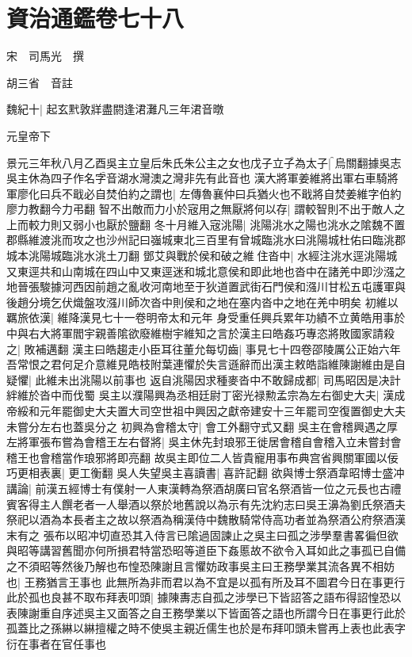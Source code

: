 \chapter{資治通鑑卷七十八}
宋　司馬光　撰

胡三省　音註

魏紀十|{
	起玄黓敦牂盡閼逢涒灘凡三年涒音暾}


元皇帝下

景元三年秋八月乙酉吳主立皇后朱氏朱公主之女也戊子立子為太子|{
	烏關翻據吳志吳主休為四子作名字音湖水灣澳之灣非先有此音也}
漢大將軍姜維將出軍右車騎將軍廖化曰兵不戢必自焚伯約之謂也|{
	左傳魯襄仲曰兵猶火也不戢將自焚姜維字伯約廖力教翻今力弔翻}
智不出敵而力小於宼用之無厭將何以存|{
	謂較智則不出于敵人之上而較力則又弱小也厭於鹽翻}
冬十月維入宼洮陽|{
	洮陽洮水之陽也洮水之隂魏不置郡縣維渡洮而攻之也沙州記曰嵹城東北三百里有曾城臨洮水曰洮陽城杜佑曰臨洮郡城本洮陽城臨洮水洮土刀翻}
鄧艾與戰於侯和破之維住沓中|{
	水經注洮水逕洮陽城又東逕共和山南城在四山中又東逕迷和城北意侯和即此地也沓中在諸羌中即沙漒之地晉張駿據河西因前趙之亂收河南地至于狄道置武街石門侯和漒川甘松五屯護軍與後趙分境乞伏熾盤攻漒川師次沓中則侯和之地在塞内沓中之地在羌中明矣}
初維以羈旅依漢|{
	維降漢見七十一卷明帝太和元年}
身受重任興兵累年功績不立黄皓用事於中與右大將軍閻宇親善隂欲廢維樹宇維知之言於漢主曰皓姦巧專恣將敗國家請殺之|{
	敗補邁翻}
漢主曰皓趨走小臣耳往董允每切齒|{
	事見七十四卷邵陵厲公正始六年}
吾常恨之君何足介意維見皓枝附葉連懼於失言遜辭而出漢主敕皓詣維陳謝維由是自疑懼|{
	此維未出洮陽以前事也}
返自洮陽因求種麥沓中不敢歸成都|{
	司馬昭因是决計絆維於沓中而伐蜀}
吳主以濮陽興為丞相廷尉丁密光禄勲孟宗為左右御史大夫|{
	漢成帝綏和元年罷御史大夫置大司空世祖中興因之獻帝建安十三年罷司空復置御史大夫未嘗分左右也蓋吳分之}
初興為會稽太守|{
	會工外翻守式又翻}
吳主在會稽興遇之厚左將軍張布嘗為會稽王左右督將|{
	吳主休先封琅邪王徙居會稽自會稽入立未嘗封會稽王也會稽當作琅邪將即亮翻}
故吳主即位二人皆貴寵用事布典宫省興關軍國以佞巧更相表裏|{
	更工衡翻}
吳人失望吳主喜讀書|{
	喜許記翻}
欲與博士祭酒韋昭博士盛冲講論|{
	前漢五經博士有僕射一人東漢轉為祭酒胡廣曰官名祭酒皆一位之元長也古禮賓客得主人饌老者一人舉酒以祭於地舊說以為示有先沈約志曰吳王濞為劉氏祭酒夫祭祀以酒為本長者主之故以祭酒為稱漢侍中魏散騎常侍高功者並為祭酒公府祭酒漢末有之}
張布以昭冲切直恐其入侍言已隂過固諫止之吳主曰孤之涉學羣書畧徧但欲與昭等講習舊聞亦何所損君特當恐昭等道臣下姦慝故不欲令入耳如此之事孤已自備之不須昭等然後乃解也布惶恐陳謝且言懼妨政事吳主曰王務學業其流各異不相妨也|{
	王務猶言王事也}
此無所為非而君以為不宜是以孤有所及耳不圖君今日在事更行此於孤也良甚不取布拜表叩頭|{
	據陳夀志自孤之涉學已下皆詔答之語布得詔惶恐以表陳謝重自序述吳主又面答之自王務學業以下皆面答之語也所謂今日在事更行此於孤蓋比之孫綝以綝擅權之時不使吳主親近儒生也於是布拜叩頭未嘗再上表也此表字衍在事者在官任事也}
